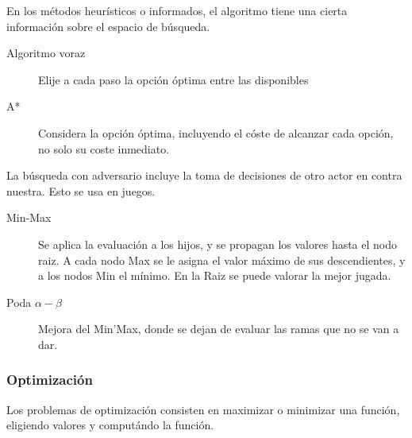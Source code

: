         En los métodos heurísticos o informados, el algoritmo tiene una cierta información sobre el espacio de búsqueda.

        \begin{description}
            \item[Algoritmo voraz] Elije a cada paso la opción óptima entre las disponibles
            \item[A*] Considera la opción óptima, incluyendo el cóste de alcanzar cada opción, no solo su coste inmediato. 
        \end{description}

        La búsqueda con adversario incluye la toma de decisiones de otro actor en contra nuestra. Esto se usa en juegos.

        \begin{description}
            \item[Min-Max] Se aplica la evaluación a los hijos, y se propagan los valores hasta el nodo raiz. A cada nodo Max se le asigna el valor máximo de sus descendientes, y a los nodos Min el mínimo. En la Raiz se puede valorar la mejor jugada.
            \item[Poda \begin{math}\alpha-\beta\end{math}] Mejora del Min'Max, donde se dejan de evaluar las ramas que no se van a dar.
        \end{description}

    \subsubsection{Optimización}
        Los problemas de optimización consisten en maximizar o minimizar una función, eligiendo valores y computándo la función.

